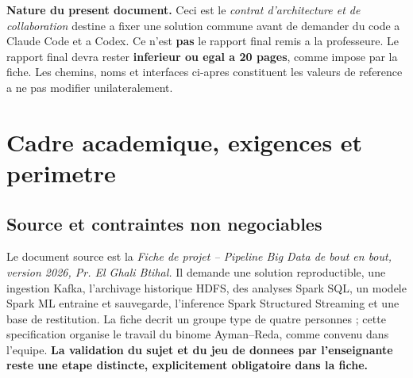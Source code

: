 \documentclass[10pt,a4paper]{article}
\newcommand{\docref}{\emph{Fiche de projet -- Pipeline Big Data de bout en bout, version 2026, Pr. El Ghali Btihal.}}
\begin{document}
\begin{notebox}
\textbf{Nature du present document.} Ceci est le \emph{contrat d'architecture et de collaboration} destine a fixer une solution commune avant de demander du code a Claude Code et a Codex. Ce n'est \textbf{pas} le rapport final remis a la professeure. Le rapport final devra rester \textbf{inferieur ou egal a 20 pages}, comme impose par la fiche. Les chemins, noms et interfaces ci-apres constituent les valeurs de reference a ne pas modifier unilateralement.
\end{notebox}
\tableofcontents
\clearpage

\section{Cadre academique, exigences et perimetre}
\subsection{Source et contraintes non negociables}
Le document source est la \docref{} Il demande une solution reproductible, une ingestion Kafka, l'archivage historique HDFS, des analyses Spark SQL, un modele Spark ML entraine et sauvegarde, l'inference Spark Structured Streaming et une base de restitution. La fiche decrit un groupe type de quatre personnes ; cette specification organise le travail du binome Ayman--Reda, comme convenu dans l'equipe. \textbf{La validation du sujet et du jeu de donnees par l'enseignante reste une etape distincte, explicitement obligatoire dans la fiche.}
\end{document}
